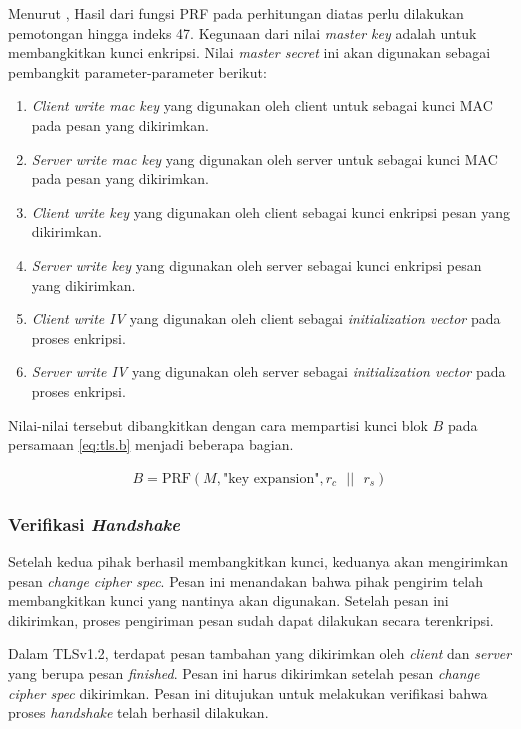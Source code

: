 Menurut \textcite{rfc5246}, Hasil dari fungsi PRF pada perhitungan diatas perlu dilakukan pemotongan hingga indeks 47. Kegunaan dari nilai \emph{master key} adalah untuk membangkitkan kunci enkripsi. Nilai \emph{master secret} ini akan digunakan sebagai pembangkit parameter-parameter berikut:

\begin{enumerate}
  \item \emph{Client write mac key} yang digunakan oleh client untuk sebagai kunci MAC pada pesan yang dikirimkan.
  \item \emph{Server write mac key} yang digunakan oleh server untuk sebagai kunci MAC pada pesan yang dikirimkan.
  \item \emph{Client write key} yang digunakan oleh client sebagai kunci enkripsi pesan yang dikirimkan.
  \item \emph{Server write key} yang digunakan oleh server sebagai kunci enkripsi pesan yang dikirimkan.
  \item \emph{Client write IV} yang digunakan oleh client sebagai \emph{initialization vector} pada proses enkripsi.
  \item \emph{Server write IV} yang digunakan oleh server sebagai \emph{initialization vector} pada proses enkripsi.
\end{enumerate}

Nilai-nilai tersebut dibangkitkan dengan cara mempartisi kunci blok $B$ pada persamaan \ref{eq:tls.b} menjadi beberapa bagian.

\begin{equation}
  \label{eq:tls.b}
  \begin{array}{l}
    B = \text{PRF}(M, \text{"key expansion"}, r_c \text{ }||\text{ }r_s)
  \end{array}
\end{equation}

\subsubsection{Verifikasi \emph{Handshake}}
Setelah kedua pihak berhasil membangkitkan kunci, keduanya akan mengirimkan pesan \emph{change cipher spec}. Pesan ini menandakan bahwa pihak pengirim telah membangkitkan kunci yang nantinya akan digunakan. Setelah pesan ini dikirimkan, proses pengiriman pesan sudah dapat dilakukan secara terenkripsi. 

Dalam TLSv1.2, terdapat pesan tambahan yang dikirimkan oleh \emph{client} dan \emph{server} yang berupa pesan \emph{finished}. Pesan ini harus dikirimkan setelah pesan \emph{change cipher spec} dikirimkan. Pesan ini ditujukan untuk melakukan verifikasi bahwa proses \emph{handshake} telah berhasil dilakukan.

